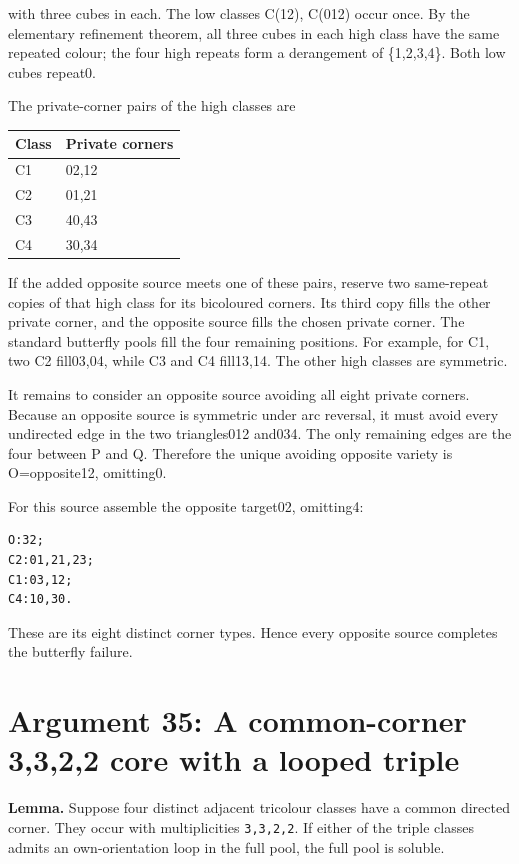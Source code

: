 \documentclass[
  10pt,
]{article}
\begin{document}
with three cubes in each. The low classes C(12), C(012) occur once. By
the elementary refinement theorem, all three cubes in each high class
have the same repeated colour; the four high repeats form a derangement
of \{1,2,3,4\}. Both low cubes repeat0.

The private-corner pairs of the high classes are

\begin{longtable}[]{@{}ll@{}}
\toprule\noalign{}
Class & Private corners \\
\midrule\noalign{}
\endhead
\bottomrule\noalign{}
\endlastfoot
C1 & 02,12 \\
C2 & 01,21 \\
C3 & 40,43 \\
C4 & 30,34 \\
\end{longtable}

If the added opposite source meets one of these pairs, reserve two
same-repeat copies of that high class for its bicoloured corners. Its
third copy fills the other private corner, and the opposite source fills
the chosen private corner. The standard butterfly pools fill the four
remaining positions. For example, for C1, two C2 fill03,04, while C3 and
C4 fill13,14. The other high classes are symmetric.

It remains to consider an opposite source avoiding all eight private
corners. Because an opposite source is symmetric under arc reversal, it
must avoid every undirected edge in the two triangles012 and034. The
only remaining edges are the four between P and Q. Therefore the unique
avoiding opposite variety is O=opposite12, omitting0.

For this source assemble the opposite target02, omitting4:

\begin{verbatim}
O:32;
C2:01,21,23;
C1:03,12;
C4:10,30.
\end{verbatim}

These are its eight distinct corner types. Hence every opposite source
completes the butterfly failure.

\hypertarget{arg-35}{%
\section{Argument 35: A common-corner 3,3,2,2 core with a looped
triple}\label{arg-35}}

\textbf{Lemma.} Suppose four distinct adjacent tricolour classes have a
common directed corner. They occur with multiplicities \texttt{3,3,2,2}.
If either of the triple classes admits an own-orientation loop in the
full pool, the full pool is soluble.
\end{document}
